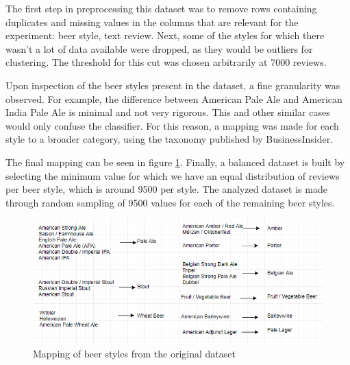 \documentclass[12pt]{article}
\begin{document}
	The first step in preprocessing this dataset was to remove rows containing duplicates and missing values in the columns that are relevant for the experiment: beer style, text review. Next, some of the styles for which there wasn't a lot of data available were dropped, as they would be outliers for clustering. The threshold for this cut was chosen arbitrarily at 7000 reviews. 
	
	Upon inspection of the beer styles present in the dataset, a fine granularity was observed. For example, the difference between American Pale Ale and American India Pale Ale is minimal and not very rigorous. This and other similar cases would only confuse the classifier. For this reason, a mapping was made for each style to a broader category, using the taxonomy published by BusinessInsider\cite{BeerTaxonomy}. 
	
	The final mapping can be seen in figure \ref{fig:styleMapping}. Finally, a balanced dataset is built by selecting the minimum value for which we have an equal distribution of reviews per beer style, which is around 9500 per style. The analyzed dataset is made through random sampling of 9500 values for each of the remaining beer styles.
	
	\begin{figure}
		\includegraphics[width=\linewidth]{resources/MappingDiagram.png}
		\caption{Mapping of beer styles from the original dataset}
		\label{fig:styleMapping}
	\end{figure}
	
	
	\newpage
	
	
\end{document}
